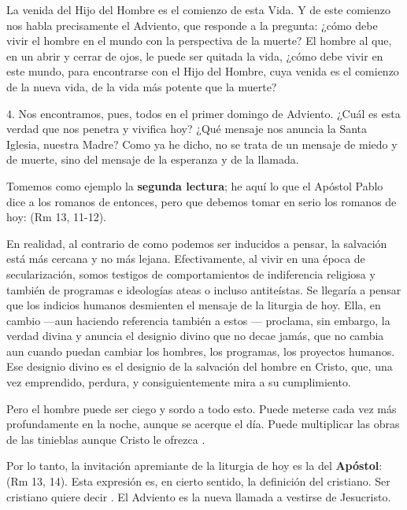 \begin{body}
					La venida del Hijo del Hombre es el comienzo de esta Vida. Y de este comienzo nos habla precisamente el Adviento, que responde a la pregunta: ¿cómo debe vivir el hombre en el mundo con la perspectiva de la muerte? El hombre al que, en un abrir y cerrar de ojos, le puede ser quitada la vida, ¿cómo debe vivir en este mundo, para encontrarse con el Hijo del Hombre, cuya venida es el comienzo de la nueva vida, de la vida más potente que la muerte? 
					
					4. Nos encontramos, pues, todos en el primer domingo de Adviento. ¿Cuál es esta verdad que nos penetra y vivifica hoy? ¿Qué mensaje nos anuncia la Santa Iglesia, nuestra Madre? Como ya he dicho, no se trata de un mensaje de miedo y de muerte, sino del mensaje de la esperanza y de la llamada. 
					
					Tomemos como ejemplo la \textbf{segunda lectura}; he aquí lo que el Apóstol Pablo dice a los romanos de entonces, pero que debemos tomar en serio los romanos de hoy:  (Rm 13, 11-12). 
					
					En realidad, al contrario de como podemos ser inducidos a pensar, la salvación está más cercana y no más lejana. Efectivamente, al vivir en una época de secularización, somos testigos de comportamientos de indiferencia religiosa y también de programas e ideologías ateas o incluso antiteístas. Se llegaría a pensar que los indicios humanos desmienten el mensaje de la liturgia de hoy. Ella, en cambio ---aun haciendo referencia también a estos --- proclama, sin embargo, la verdad divina y anuncia el designio divino que no decae jamás, que no cambia aun cuando puedan cambiar los hombres, los programas, los proyectos humanos. Ese designio divino es el designio de la salvación del hombre en Cristo, que, una vez emprendido, perdura, y consiguientemente mira a su cumplimiento. 
					
					Pero el hombre puede ser ciego y sordo a todo esto. Puede meterse cada vez más profundamente en la noche, aunque se acerque el día. Puede multiplicar las obras de las tinieblas aunque Cristo le ofrezca . 
					
					Por lo tanto, la invitación apremiante de la liturgia de hoy es la del \textbf{Apóstol}:  (Rm 13, 14). Esta expresión es, en cierto sentido, la definición del cristiano. Ser cristiano quiere decir . El Adviento es la nueva llamada a vestirse de Jesucristo. 
					

\end{body}
